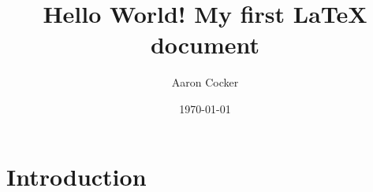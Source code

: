 \documentclass[a4paper,12pt]{article}
\begin{document}
\title{Hello World! My first LaTeX document}
\author{Aaron Cocker}
\date{\today}
\maketitle

\section{Introduction}
\end{document}

